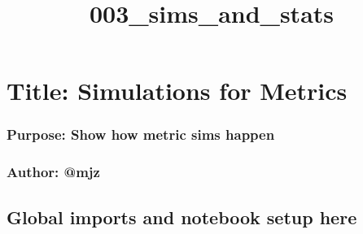 \documentclass[11pt]{article}
\title{003\_sims\_and\_stats}
\begin{document}
    
    \maketitle
    
    

    
    \section{Title: Simulations for
Metrics}\label{title-simulations-for-metrics}

\subsubsection{Purpose: Show how metric sims
happen}\label{purpose-show-how-metric-sims-happen}

\subsubsection{Author: @mjz}\label{author-mjz}

    \subsection{Global imports and notebook setup
here}\label{global-imports-and-notebook-setup-here}
\end{document}
